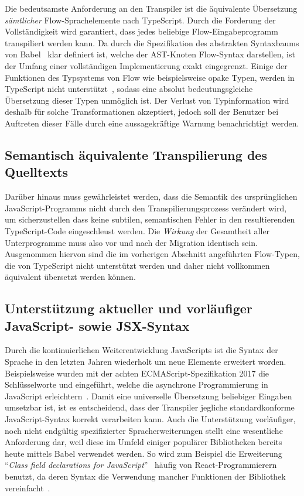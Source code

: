 Die bedeutsamste Anforderung an den Transpiler ist die äquivalente Übersetzung \emph{sämtlicher} Flow-Sprachelemente nach TypeScript. Durch die Forderung der Vollständigkeit wird garantiert, dass jedes beliebige Flow-Eingabeprogramm transpiliert werden kann. Da durch die Spezifikation des abstrakten Syntaxbaums von Babel~\autocite{BABEL:PARSER_SPEC} klar definiert ist, welche der AST-Knoten Flow-Syntax darstellen, ist der Umfang einer vollständigen Implementierung exakt eingegrenzt.
Einige der Funktionen des Typsystems von Flow wie beispielsweise opake Typen, werden in TypeScript nicht unterstützt~\autocite{TS:GITHUB:NO_OPAQUE_TYPE}, sodass eine absolut bedeutungsgleiche Übersetzung dieser Typen unmöglich ist. Der Verlust von Typinformation wird deshalb für solche Transformationen akzeptiert, jedoch soll der Benutzer bei Auftreten dieser Fälle durch eine aussagekräftige Warnung benachrichtigt werden.

\subsection{Semantisch äquivalente Transpilierung des Quelltexts}
\label{sec:requirement:semantic-equivalence}

Darüber hinaus muss gewährleistet werden, dass die Semantik des ursprünglichen JavaScript-Programms nicht durch den Transpilierungsprozess verändert wird, um sicherzustellen dass keine subtilen, semantischen Fehler in den resultierenden TypeScript-Code eingeschleust werden. Die \emph{Wirkung} der Gesamtheit aller Unterprogramme muss also vor und nach der Migration identisch sein. Ausgenommen hiervon sind die im vorherigen Abschnitt angeführten Flow-Typen, die von TypeScript nicht unterstützt werden und daher nicht vollkommen äquivalent übersetzt werden können.

\subsection{Unterstützung aktueller und vorläufiger JavaScript- sowie JSX-Syntax}
\label{sec:requirement:syntax}

Durch die kontinuierlichen Weiterentwicklung JavaScripts ist die Syntax der Sprache in den letzten Jahren wiederholt um neue Elemente erweitert worden. Beispielsweise wurden mit der achten ECMAScript-Spezifikation 2017 die Schlüsselworte  und  eingeführt, welche die asynchrone Programmierung in JavaScript erleichtern~\autocite[430]{ECMASCRIPT:2017}. Damit eine universelle Übersetzung beliebiger Eingaben umsetzbar ist, ist es entscheidend, dass der Transpiler jegliche standardkonforme JavaScript-Syntax korrekt verarbeiten kann. Auch die Unterstützung vorläufiger, noch nicht endgültig spezifizierter Spracherweiterungen stellt eine wesentliche Anforderung dar, weil diese im Umfeld einiger populärer Bibliotheken bereits heute mittels Babel verwendet werden. So wird zum Beispiel die Erweiterung \enquote{\textit{Class field declarations for JavaScript}}~\autocite{ES_PROPOSAL:CLASS_FIELDS} häufig von React-Programmierern benutzt, da deren Syntax die Verwendung mancher Funktionen der Bibliothek vereinfacht~\autocite{REACT:HANDLING_EVENTS}.

